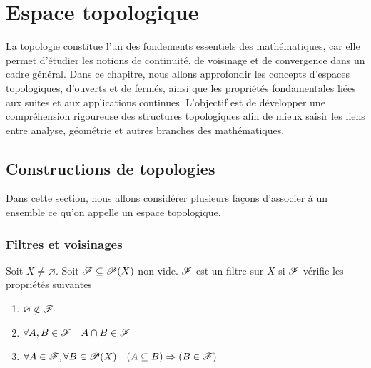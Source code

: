 \chapter{Espace topologique}

La topologie constitue l’un des fondements essentiels des mathématiques, car elle permet d’étudier les notions de continuité, de voisinage et de convergence dans un cadre général. Dans ce chapitre, nous allons approfondir les concepts d’espaces topologiques, d’ouverts et de fermés, ainsi que les propriétés fondamentales liées aux suites et aux applications continues. L’objectif est de développer une compréhension rigoureuse des structures topologiques afin de mieux saisir les liens entre analyse, géométrie et autres branches des mathématiques.

\section{Constructions de topologies}
 
Dans cette section, nous allons considérer plusieurs façons d'associer à un ensemble ce qu'on appelle un espace topologique.
\subsection{Filtres et voisinages}
\begin{definition}
    Soit $X\ne \varnothing$. Soit $\mathscr{F}\subseteq\mathscr{P}(X)$ non vide. $\mathscr{F}$ est un filtre sur $X$ si $\mathscr{F}$ vérifie les propriétés suivantes
    
    \begin{enumerate}
        \item $\varnothing\notin\mathscr{F}$
        \item $\forall A,B\in \mathscr{F} \quad A\cap B\in \mathscr{F}$
        \item $\forall A\in \mathscr{F},\forall B\in \mathscr{P}(X) \quad (A\subseteq B)\Rightarrow(B\in \mathscr{F})$
    \end{enumerate}
    
\end{definition}

